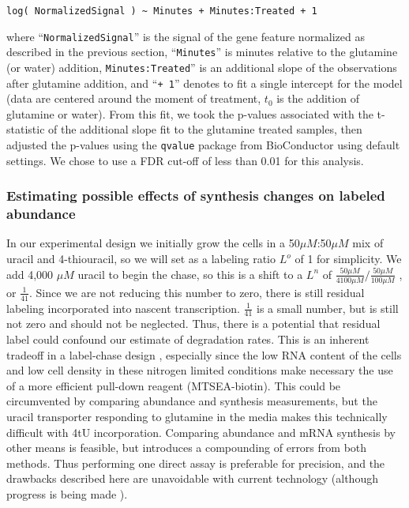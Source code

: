 {\begin{verbatim}
log( NormalizedSignal ) ~ Minutes + Minutes:Treated + 1
\end{verbatim}

where ``\texttt{NormalizedSignal}'' is the signal of the gene feature
normalized as described in the previous section, ``\texttt{Minutes}'' is
minutes relative to the glutamine (or water) addition,
\texttt{Minutes:Treated}'' is an additional slope of the observations
after glutamine addition, and ``\texttt{+\ 1}'' denotes to fit a single
intercept for the model (data are centered around the moment of 
treatment, $t_0$ is the addition of glutamine or water). 
From this fit, we took the p-values associated
with the t-statistic of the additional slope fit to the glutamine
treated samples, then adjusted the p-values using the \texttt{qvalue}
package from BioConductor using default settings. We chose to use a FDR
cut-off of less than 0.01 for this analysis.

\subsubsection{Estimating possible effects of synthesis changes on
labeled
abundance}\label{estimating-possible-effects-of-synthesis-changes-on-labeled-abundance}

In our experimental design we initially grow the cells in a
50\(\mu M\):50\(\mu M\) mix of uracil and 4-thiouracil, so we will set
as a labeling ratio \(L^o\) of 1 for simplicity. We add 4,000 \(\mu M\)
uracil to begin the chase, so this is a shift to a \(L^n\) of
\(\frac{50 \mu M}{4100 \mu M} / \frac{50 \mu M}{100 \mu M}\) , or
\(\frac{1}{41}\). Since we are not reducing this number to zero, there
is still residual labeling incorporated into nascent transcription.
\(\frac{1}{41}\) is a small number, but is still not zero and should
not be neglected.
Thus, there is a potential that residual label could confound our
estimate of degradation rates. This is an inherent tradeoff in a
label-chase design \parencite{perez2013eukaryotic}, 
especially since the low RNA content of the cells
and low cell density in these nitrogen limited conditions make necessary
the use of a more efficient pull-down reagent (MTSEA-biotin). This could
be circumvented by comparing abundance and synthesis measurements, but
the uracil transporter responding to glutamine in the media makes this
technically difficult with 4tU incorporation. Comparing abundance and
mRNA synthesis by other means is feasible, but introduces a compounding
of errors from both methods. Thus performing one direct assay is
preferable for precision, and the drawbacks described here are
unavoidable with current technology (although progress is being made
\cite{chan2017non}).

}
